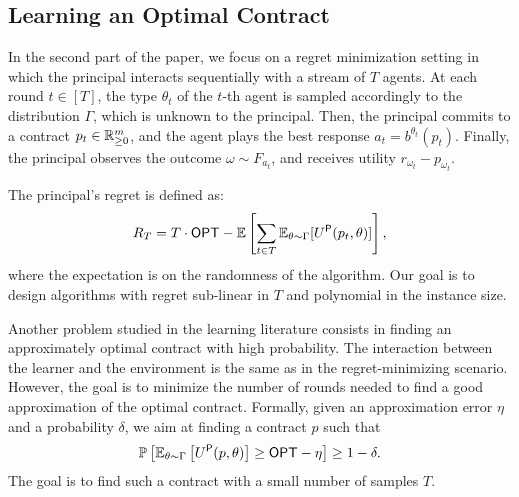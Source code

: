 \subsection{Learning an Optimal Contract}\label{sec:prelimLearning}

In the second part of the paper, we focus on a regret minimization setting in which the principal interacts sequentially with a stream of $T$ agents.
At each round $t\in [T]$, the type $\theta_t$ of the $t$-th agent is sampled accordingly to the distribution $\Gamma$, which is unknown to the principal.
%
Then, the principal commits to a contract $p_t\in\mathbb{R}^m_{\ge 0}$, and the agent plays the best response $a_t=b^{\theta_t}(p_t)$. Finally, the principal observes the outcome $\omega \sim F_{a_t}$, and receives utility $r_{\omega_t}-p_{\omega_t}$. 

The principal's regret is defined as:
\[
R_T= T \cdot\textsf{OPT}- \mathbb{E}\left[\sum_{t \in T}  \mathbb{E}_{\theta\sim \Gamma}[U^\textsf{P}(p_t,\theta)]\right],   
\]
where the expectation is on the randomness of the algorithm.
Our goal is to design algorithms with regret sub-linear in $T$ and polynomial in the instance size.

Another problem studied in the learning literature consists in finding an approximately optimal contract with high probability. The interaction between the learner and the environment is the same as in the regret-minimizing scenario. However, the goal is to minimize the number of rounds needed to find a good approximation of the optimal contract.
Formally, given an approximation error $\eta$ and a probability $\delta$, we aim at finding a contract $p$ such that
\[
\mathbb{P}\left[\mathbb{E}_{\theta\sim \Gamma}\left[U^\textsf{P}(p,\theta)\right]\ge \textsf{OPT}-\eta\right]\ge 1-\delta.
\]
The goal is to find such a contract with a small number of samples $T$.

